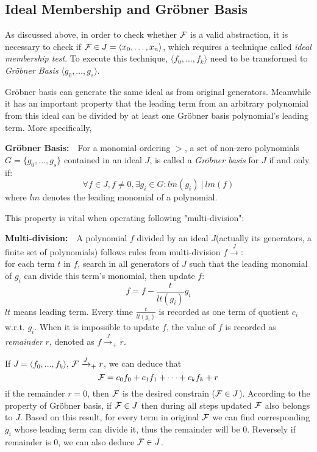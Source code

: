 \subsection{Ideal Membership and Gr\"obner Basis}
As discussed above, in order to check whether ${\mathcal{F}}$ is a valid abstraction, it is necessary to check if 
${\mathcal{F}}\in J=\langle x_0,\dots,x_n\rangle$, which requires a technique called \emph{ideal membership test}.
To execute this technique, $\langle f_0,\dots,f_k\rangle$ need to be transformed to \emph{Gr\"obner Basis}
$\langle g_0,\dots,g_s\rangle$.

Gr\"obner basis can generate the same ideal as from original generators. Meanwhile it has an important property
that the leading term from an arbitrary polynomial from this ideal can be divided by at least one Gr\"obner
basis polynomial's leading term. More specifically,
\begin{Definition}
{\bf Gr\"obner Basis:}\ \ For a monomial ordering $>$, a set of non-zero polynomials $G=\{g_0,\dots,g_s\}$
contained in an ideal $J$, is called a \emph{Gr\"obner basis} for $J$ if and only if:
$$\forall f\in J, f\neq 0, \exists g_i\in G: lm(g_i)\ |\ lm(f)$$
where $lm$ denotes the leading monomial of a polynomial.
\end{Definition}

This property is vital when operating following "multi-division":
\begin{Definition}
{\bf Multi-division:}\ \ A polynomial $f$ divided by an ideal $J$(actually its generators, a finite set of
polynomials) follows rules from multi-division $f\xrightarrow{J}$:\\
for each term $t$ in $f$, search in all generators of $J$ such that the leading monomial of $g_i$ can divide
this term's monomial, then update $f$:
$$f = f - \frac{t}{lt(g_i)}g_i$$
$lt$ means leading term. Every time $\frac{t}{lt(g_i)}$ is recorded as one term of quotient $c_i$ w.r.t. $g_i$.
When it is impossible to update $f$, the value of $f$ is recorded as \emph{remainder} $r$, denoted as
$f\xrightarrow{J}_{+}r$.
\end{Definition}

If $J = \langle f_0,\dots,f_k\rangle$, ${\mathcal{F}}\xrightarrow{J}_+r$, we can deduce that
$${\mathcal{F}} = c_0f_0+c_1f_1+\cdots+c_kf_k + r$$
if the remainder $r=0$, then ${\mathcal{F}}$ is the desired constrain (${\mathcal{F}}\in J$). According to the property of
Gr\"obner basis, if ${\mathcal{F}}\in J$ then during all steps updated ${\mathcal{F}}$ also belongs to $J$. Based on this result,
for every
term in original ${\mathcal{F}}$ we can find corresponding $g_i$ whose leading term can divide it, thus the remainder
will be 0. Reversely if remainder is 0, we can also deduce ${\mathcal{F}}\in J$.

